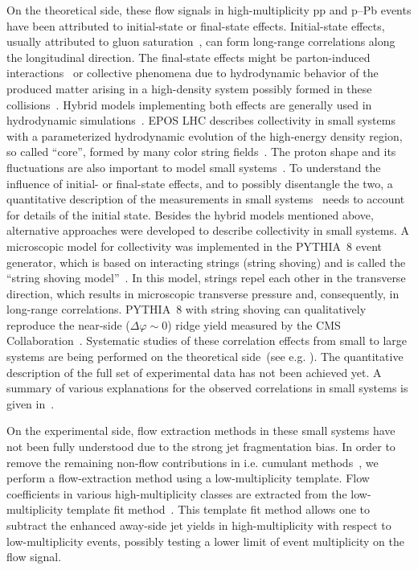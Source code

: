 On the theoretical side, these flow signals in high-multiplicity pp and p--Pb events have been attributed to initial-state or final-state effects. Initial-state effects, usually attributed to gluon saturation~\cite{Dusling:2012cg,Bzdak:2013zma}, can form long-range
correlations along the longitudinal direction. The final-state effects might be parton-induced interactions~\cite{Arbuzov:2011yr} or collective phenomena due to hydrodynamic behavior of the produced matter arising in a high-density system possibly formed in these collisions~\cite{Weller:2017tsr,Zhao:2017rgg}. 
Hybrid models implementing both effects are generally used in hydrodynamic simulations~\cite{Greif:2017bnr,Mantysaari:2017cni}. EPOS LHC describes collectivity in small systems with a parameterized hydrodynamic evolution of the high-energy density region, so called ``core'', formed by many color string fields~\cite{Pierog:2013ria}.
The proton shape and its fluctuations are also important to model small systems~\cite{Mantysaari:2017cni}.
To understand the influence of initial- or final-state effects, and to possibly disentangle the two, a quantitative description of the measurements in small systems~\cite{Schenke:2019pmk,Schenke:2020mbo} needs to account for details of the initial state.
Besides the hybrid models mentioned above, alternative approaches were developed to describe collectivity in small systems. A microscopic model for collectivity was implemented in the PYTHIA~8 event generator, which is based on interacting strings (string shoving) and is called the “string shoving model”~\cite{Bierlich:2017vhg}. In this model, strings repel each other in the transverse direction, which results in microscopic transverse pressure and, consequently, in long-range correlations. PYTHIA~8 with string shoving can qualitatively reproduce the near-side ($\Delta\varphi\sim0$) ridge yield measured by the CMS Collaboration~\cite{Khachatryan:2016txc}.
Systematic studies of these correlation effects from small to large systems are being performed on the theoretical side~(see e.g. \cite{Schenke:2020mbo}).
The quantitative description of the full set of experimental data has not been achieved yet. A summary of various explanations for the observed correlations in small systems is given in~\cite{Strickland:2018exs,Loizides:2016tew,Nagle:2018nvi}. 

On the experimental side, flow extraction methods in these small systems have not been fully understood due to the strong jet fragmentation bias. In order to remove the remaining non-flow contributions in i.e. cumulant methods~\cite{Bilandzic:2010jr, Acharya:2019vdf}, we perform a flow-extraction method using a low-multiplicity template. Flow coefficients in various high-multiplicity classes are extracted from the low-multiplicity template fit method~\cite{ATLAS:2015hzw,ATLAS:2016yzd}. This template fit method allows one to subtract the enhanced away-side jet yields in high-multiplicity with respect to low-multiplicity events, possibly testing a lower limit of event multiplicity on the flow signal.

